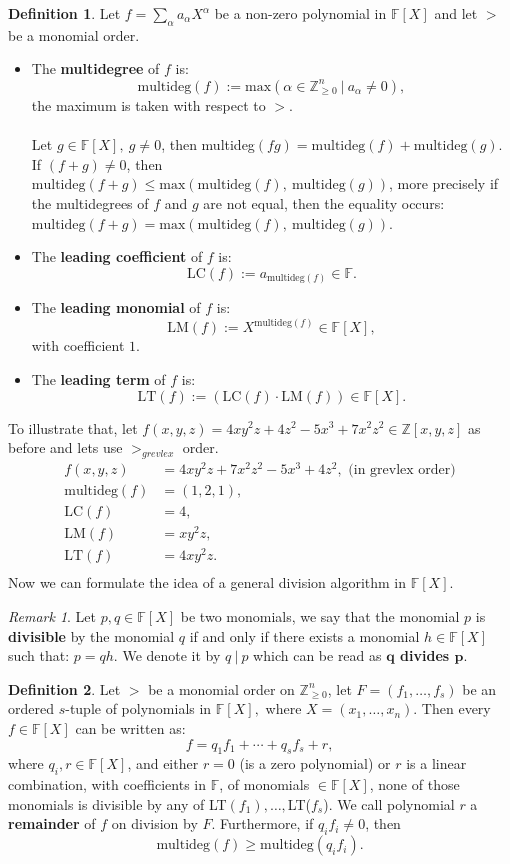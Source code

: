 \documentclass[thesis=M,english]{FITthesis}[2012/10/20]
\theoremstyle{remark}
\newtheorem*{RM}{Remark}
\theoremstyle{definition}
\newtheorem{DF}{Definition}[section]
\begin{document}
\begin{DF}
Let $f = \sum_\alpha a_\alpha X^\alpha$ be a non-zero polynomial in $\mathbb{F}[X]$ and let $>$ be a monomial order.
\begin{itemize}
\item The \textbf{multidegree} of $f$ is:
$$
\text{multideg}(f) := \text{max}(\alpha \in \mathbb{Z}_{\geq 0}^n\ |\ a_\alpha \neq 0),
$$
the maximum is taken with respect to $>$.\\ \\
Let $g \in \mathbb{F}[X],\ g \neq 0$, then multideg$(fg) = \text{multideg}(f) + \text{multideg}(g)$. If $(f + g) \neq 0$, then $\text{multideg}(f + g) \leq \text{max}(\text{multideg}(f),\ \text{multideg}(g))$, more precisely if the multidegrees of $f$ and $g$ are not equal, then the equality occurs: $\text{multideg}(f + g) = \text{max}(\text{multideg}(f),\ \text{multideg}(g))$.
\item The \textbf{leading coefficient} of $f$ is:
$$
\text{LC}(f) := a_{\text{multideg}(f)} \in \mathbb{F}.
$$
\item The \textbf{leading monomial} of $f$ is:
$$
\text{LM}(f) := X^{\text{multideg}(f)} \in \mathbb{F}[X],
$$
with coefficient $1$.
\item The \textbf{leading term} of $f$ is:
$$
\text{LT}(f) := (\text{LC}(f)\cdot \text{LM}(f)) \in \mathbb{F}[X].
$$
\end{itemize}
\end{DF}
\noindent To illustrate that, let $f(x,y,z) = 4xy^2z + 4z^2 - 5x^3 + 7x^2z^2 \in \mathbb{Z}[x,y,z]$ as before and lets use $>_{grevlex}$ order.
\begin{align*}
f(x,y,z) &= 4xy^2z + 7x^2z^2  -5x^3 + 4z^2, \text{ (in  grevlex order)}\\
\text{multideg}(f)&=(1,2,1), \\
\text{LC}(f)&=4, \\
\text{LM}(f)&=xy^2z, \\
\text{LT}(f)&=4xy^2z. \\
\end{align*}
Now we can formulate the idea of a general division algorithm in $\mathbb{F}[X]$.
\begin{RM}
Let $p, q \in \mathbb{F}[X]$ be two monomials, we say that the monomial $p$ is \textbf{divisible} by the monomial $q$ if and only if there exists a monomial $h \in \mathbb{F}[X]$ such that: $p = qh$. We denote it by $q\ |\ p$ which can be read  as \textbf{$\mathbf{q}$ divides $\mathbf{p}$}.
\end{RM}
\begin{DF}
Let $>$ be a monomial order on $\mathbb{Z}_{\geq 0}^n$, let $F = (f_1, \ldots, f_s)$ be an ordered $s$-tuple of polynomials in $\mathbb{F}[X],$ where $X = (x_1, \ldots, x_n)$. Then every $f \in \mathbb{F}[X]$ can be written as:
$$
f = q_1f_1 + \cdots + q_sf_s + r,
$$
where $q_i, r \in \mathbb{F}[X]$, and either $r = 0$ (is a zero polynomial) or $r$ is a linear combination, with coefficients in $\mathbb{F}$, of monomials $\in \mathbb{F}[X]$, none of those monomials is divisible by any of LT$(f_1), \ldots,$LT($f_s$).
We call polynomial $r$ a \textbf{remainder} of $f$ on division by $F$. Furthermore, if $q_if_i \neq 0$, then
$$
\text{multideg}(f) \geq \text{multideg}(q_if_i).
$$
\end{DF}
\end{document}

